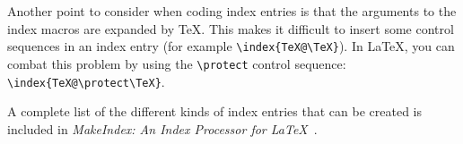 Another point to consider when coding index entries is that the arguments
to the index macros are expanded by \TeX.  This makes it difficult to insert
some control sequences in 
an index entry (for example \verb|\index{TeX@\TeX}|).
In \LaTeX, you can combat this problem by using the \verb|\protect| control
sequence: \verb|\index{TeX@\protect\TeX}|.

A complete list of the different kinds of index entries that can be
created is included in \textit{MakeIndex: An Index Processor for 
\LaTeX}~\cite{ll:makeindex}.

%
%
%
%
%
%
%
%
%
%
%
%
%
%
%

